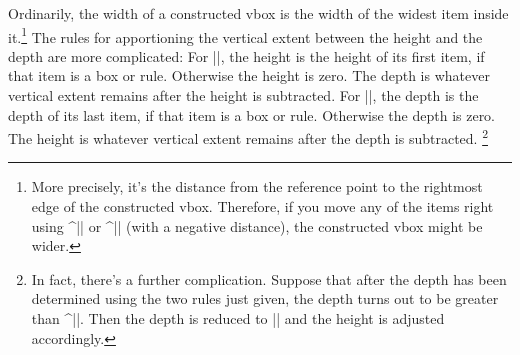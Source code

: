 Ordinarily, the width of a constructed vbox is the width of the widest
item inside it.\footnote
{More precisely, it's the distance from the reference point to the rightmost
edge of the constructed vbox.  Therefore,
if you move any of the items right using ^|\moveright| or
^|\moveleft| (with a negative distance),
the constructed vbox might be wider.}
The rules for apportioning the vertical extent between the
height and the depth are more complicated:
\ulist
\li For |\vtop|,
the height is the height of its first item, if that item is a box or rule.
Otherwise the height is zero. The depth is whatever vertical
extent remains after the height is subtracted.
\li For |\vbox|,
the depth is the depth of its last item, if that item is a box or rule.
Otherwise the depth is zero. The height is whatever vertical
extent remains after the depth is subtracted.%
\footnote{In fact, there's a further complication.
Suppose that after the depth has been determined
using the two rules just given, the depth turns out to be greater than
^|\boxmaxdepth|.
Then the depth is reduced to |\boxmaxdepth| and the height is adjusted
accordingly.} 
\endulist

